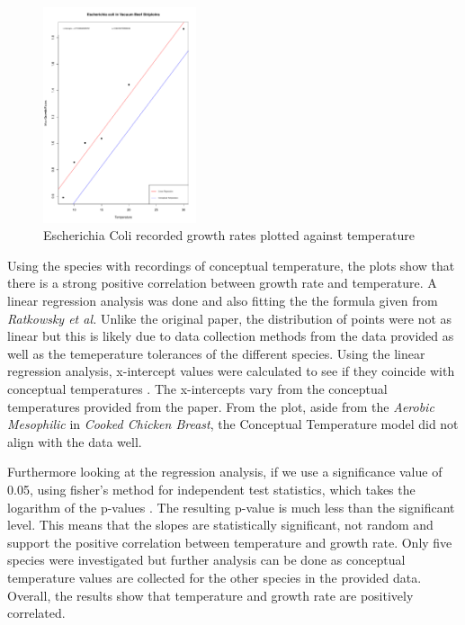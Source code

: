 \begin{figure}
    \begin{center}
        \includegraphics[width=0.40\textwidth]{../Results/Ecoli_r_temp.pdf}
    \end{center}
    \caption{Escherichia Coli recorded growth rates plotted against temperature}
    \label{fig:E.coli correlation}
\end{figure}

Using the species with recordings of conceptual temperature, the plots show that there is a strong positive correlation between growth rate and temperature. A linear regression analysis was done and also fitting the the formula given from \textit{Ratkowsky et al.} Unlike the original paper, the distribution of points were not as linear but this is likely due to data collection methods from the data provided as well as the temeperature tolerances of the different species. Using the linear regression analysis, x-intercept values were calculated to see if they coincide with conceptual temperatures \cite{ratkowsky1982relationship}. The x-intercepts vary from the conceptual temperatures provided from the paper. From the plot, aside from the \textit{Aerobic Mesophilic} in \textit{Cooked Chicken Breast}, the Conceptual Temperature model did not align with the data well.

Furthermore looking at the regression analysis, if we use a significance value of 0.05, using fisher’s method for independent test statistics, which takes the logarithm of the p-values \cite[p.103]{fisher1992statistical}. The resulting p-value is much less than the significant level. This means that the slopes are statistically significant, not random and support the positive correlation between temperature and growth rate. Only five species were investigated but further analysis can be done as conceptual temperature values are collected for the other species in the provided data. Overall, the results show that temperature and growth rate are positively correlated.
